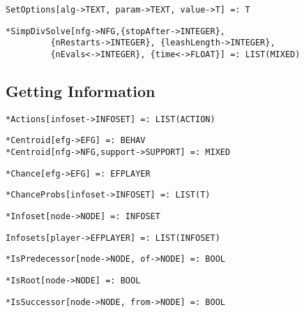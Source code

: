 \protect \large \begin{verbatim}
SetOptions[alg->TEXT, param->TEXT, value->T] =: T
\end{verbatim}\normalsize

\protect \large \begin{verbatim}
*SimpDivSolve[nfg->NFG,{stopAfter->INTEGER}, 
         {nRestarts->INTEGER}, {leashLength->INTEGER},
         {nEvals<->INTEGER}, {time<->FLOAT}] =: LIST(MIXED)
\end{verbatim}\normalsize

\medskip
\subsection{Getting Information}

\protect \large \begin{verbatim} 
*Actions[infoset->INFOSET] =: LIST(ACTION)
\end{verbatim}\normalsize

\protect \large \begin{verbatim} 
*Centroid[efg->EFG] =: BEHAV
*Centroid[nfg->NFG,support->SUPPORT] =: MIXED
\end{verbatim}\normalsize

\protect \large \begin{verbatim}
*Chance[efg->EFG] =: EFPLAYER
\end{verbatim}\normalsize

\protect \large \begin{verbatim}
*ChanceProbs[infoset->INFOSET] =: LIST(T)
\end{verbatim}\normalsize

\protect \large \begin{verbatim}
*Infoset[node->NODE] =: INFOSET
\end{verbatim}\normalsize

\protect \large \begin{verbatim}
Infosets[player->EFPLAYER] =: LIST(INFOSET)
\end{verbatim}\normalsize

\protect \large \begin{verbatim}
*IsPredecessor[node->NODE, of->NODE] =: BOOL
\end{verbatim}\normalsize

\protect \large \begin{verbatim}
*IsRoot[node->NODE] =: BOOL
\end{verbatim}\normalsize

\protect \large \begin{verbatim}
*IsSuccessor[node->NODE, from->NODE] =: BOOL
\end{verbatim}\normalsize


